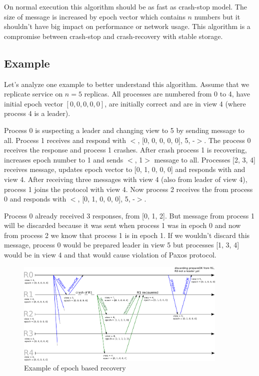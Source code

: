 On normal execution this algorithm should be as fast as crash-stop model. The size of \prepareOK message is increased by epoch vector which contains $n$ numbers but it shouldn't have big impact on performance or network usage. This algorithm is a compromise between crash-stop and crash-recovery with stable storage.  

\subsection{Example}

Let's analyze one example to better understand this algorithm. Assume that we replicate service on $n = 5$ replicas. All processes are numbered from 0 to 4, have initial epoch vector $[0, 0, 0, 0, 0]$, are initially correct and are in view 4 (where process 4 is a leader).

Process 0 is suspecting a leader and changing view to 5 by sending \prepare message to all. Process 1 receives \prepare and respond with $<$\prepareOK[], [0, 0, 0, 0, 0], 5, -$>$. The process 0 receives the response and process 1 crashes. After crash process 1 is recovering, increases epoch number to 1 and sends $<$\recovery[], 1$>$ message to all. Processes [2, 3, 4] receives \recovery message, updates epoch vector to [0, 1, 0, 0, 0] and responds with \recoveryAnswer and view 4. After receiving three \recoveryAnswer messages with view 4 (also from leader of view 4), process 1 joins the protocol with view 4. Now process 2 receives the \prepare from process 0 and responds with $<$\prepareOK[], [0, 1, 0, 0, 0], 5, -$>$.

Process 0 already received 3 \prepareOK responses, from [0, 1, 2]. But message from process 1 will be discarded because it was sent when process 1 was in epoch 0 and now from process 2 we know that process 1 is in epoch 1. If we wouldn't discard this message, process 0 would be prepared leader in view 5 but processes [1, 3, 4] would be in view 4 and that would cause violation of Paxos protocol.

\begin{figure}[h]
 \centering
 \includegraphics[keepaspectratio, width=0.9\textwidth]{epoch_recovery.pdf}
 \caption{Example of epoch based recovery}
 \label{fig:epoch_based_recovery}
\end{figure}

